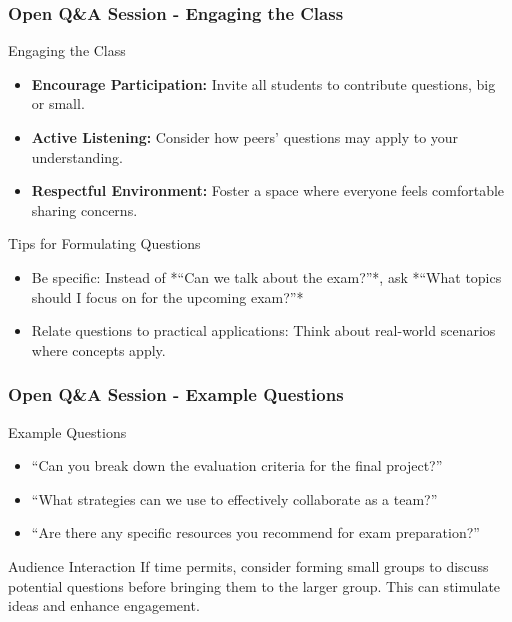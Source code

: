 \documentclass[aspectratio=169]{beamer}
\begin{document}
\begin{frame}[fragile]
    \frametitle{Open Q\&A Session - Engaging the Class}
    \begin{block}{Engaging the Class}
        \begin{itemize}
            \item \textbf{Encourage Participation:} Invite all students to contribute questions, big or small.
            \item \textbf{Active Listening:} Consider how peers' questions may apply to your understanding.
            \item \textbf{Respectful Environment:} Foster a space where everyone feels comfortable sharing concerns.
        \end{itemize}
    \end{block}
    
    \begin{block}{Tips for Formulating Questions}
        \begin{itemize}
            \item Be specific: Instead of *“Can we talk about the exam?”*, ask *“What topics should I focus on for the upcoming exam?”*
            \item Relate questions to practical applications: Think about real-world scenarios where concepts apply.
        \end{itemize}
    \end{block}
\end{frame}

\begin{frame}[fragile]
    \frametitle{Open Q\&A Session - Example Questions}
    \begin{block}{Example Questions}
        \begin{itemize}
            \item “Can you break down the evaluation criteria for the final project?”
            \item “What strategies can we use to effectively collaborate as a team?”
            \item “Are there any specific resources you recommend for exam preparation?”
        \end{itemize}
    \end{block}
    
    \begin{block}{Audience Interaction}
        If time permits, consider forming small groups to discuss potential questions before bringing them to the larger group. This can stimulate ideas and enhance engagement.
    \end{block}
\end{frame}
\end{document}
